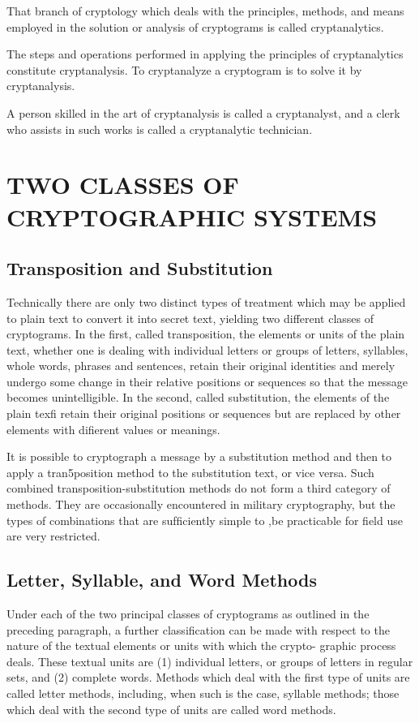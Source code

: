 \mypara That branch of cryptology which deals with the principles, methods,
and means employed in the solution or analysis of cryptograms is called
cryptanalytics.

\mypara The steps and operations performed in applying the principles of
cryptanalytics constitute cryptanalysis. To cryptanalyze a cryptogram is
to solve it by cryptanalysis.

\mypara A person skilled in the art of cryptanalysis is called a cryptanalyst,
and a clerk who assists in such works is called a cryptanalytic technician.

\section{TWO CLASSES OF CRYPTOGRAPHIC SYSTEMS}

\subsection{Transposition and Substitution}

\mypara Technically there are only two distinct types of treatment which
may be applied to plain text to convert it into secret text, yielding two
different classes of cryptograms. In the ﬁrst, called transposition, the
elements or units of the plain text, whether one is dealing with individual
letters or groups of letters, syllables, whole words, phrases and sentences,
retain their original identities and merely undergo some change in their
relative positions or sequences so that the message becomes unintelligible.
In the second, called substitution, the elements of the plain texﬁ retain
their original positions or sequences but are replaced by other elements
with diﬁerent values or meanings.

\mypara It is possible to cryptograph a message by a substitution method
and then to apply a tran5position method to the substitution text, or vice
versa. Such combined transposition-substitution methods do not form a
third category of methods. They are occasionally encountered in military
cryptography, but the types of combinations that are sufﬁciently simple to
,be practicable for ﬁeld use are very restricted.

\subsection{Letter, Syllable, and Word Methods}

Under each of the two principal classes of cryptograms as outlined in
the preceding paragraph, a further classiﬁcation can be made with respect
to the nature of the textual elements or units with which the crypto-
graphic process deals. These textual units are (1) individual letters, or
groups of letters in regular sets, and (2) complete words. Methods which
deal with the ﬁrst type of units are called letter methods, including, when
such is the case, syllable methods; those which deal with the second type
of units are called word methods.


